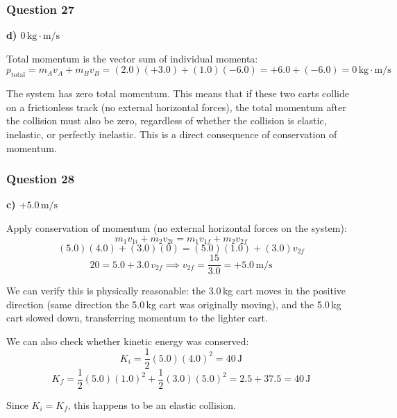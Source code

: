 \documentclass[12pt,letterpaper]{article}
\begin{document}
\subsubsection*{Question 27}

\begin{answerbox}
\textbf{d) $0\,\text{kg}\cdot\text{m/s}$}
\end{answerbox}

\begin{explanationbox}
Total momentum is the vector sum of individual momenta:
\[
p_{\text{total}} = m_A v_A + m_B v_B = (2.0)(+3.0) + (1.0)(-6.0) = +6.0 + (-6.0) = 0\,\text{kg}\cdot\text{m/s}
\]

The system has zero total momentum. This means that if these two carts collide on a frictionless track (no external horizontal forces), the total momentum after the collision must also be zero, regardless of whether the collision is elastic, inelastic, or perfectly inelastic. This is a direct consequence of conservation of momentum.
\end{explanationbox}

\subsubsection*{Question 28}

\begin{answerbox}
\textbf{c) $+5.0\,\text{m/s}$}
\end{answerbox}

\begin{explanationbox}
Apply conservation of momentum (no external horizontal forces on the system):
\[
m_1 v_{1i} + m_2 v_{2i} = m_1 v_{1f} + m_2 v_{2f}
\]
\[
(5.0)(4.0) + (3.0)(0) = (5.0)(1.0) + (3.0)v_{2f}
\]
\[
20 = 5.0 + 3.0\,v_{2f} \implies v_{2f} = \frac{15}{3.0} = +5.0\,\text{m/s}
\]

We can verify this is physically reasonable: the 3.0\,kg cart moves in the positive direction (same direction the 5.0\,kg cart was originally moving), and the 5.0\,kg cart slowed down, transferring momentum to the lighter cart.

We can also check whether kinetic energy was conserved:
\[
K_i = \frac{1}{2}(5.0)(4.0)^2 = 40\,\text{J}
\]
\[
K_f = \frac{1}{2}(5.0)(1.0)^2 + \frac{1}{2}(3.0)(5.0)^2 = 2.5 + 37.5 = 40\,\text{J}
\]

Since $K_i = K_f$, this happens to be an elastic collision.
\end{explanationbox}
\end{document}
